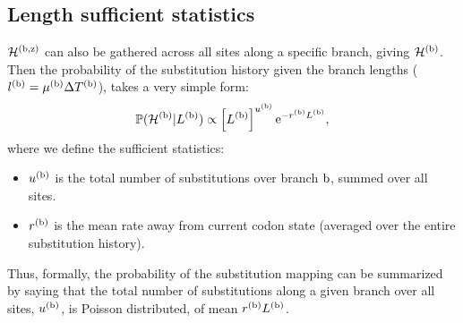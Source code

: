 \documentclass{article}
\begin{document}
	\subsection{Length sufficient statistics}
	$\mathcal{H}^{(\text{b}, \text{z})}$ can also be gathered across all sites along a specific branch, giving $\mathcal{H}^{(\text{b})}$.
	Then the probability of the {substitution} history given the branch lengths ($l^{(\text{b})} = \mu^{(\text{b})} \Delta T^{(\text{b})}$), takes a very simple form:
	\begin{equation}
		\label{eq:LengthSuffStat}
		\mathbb{P} (\mathcal{H}^{(\text{b})} | L^{(\text{b})}) \propto \left[ L^{(\text{b})}\right]^{u^{(\text{b})}} \text{e}^{- r^{(\text{b})} L^{(\text{b})}},
	\end{equation}
	where we define the sufficient statistics:
	\begin{itemize}
		\setlength\itemsep{-0.25em}
		\item $u^{(\text{b})}$ is the total number of substitutions over branch $\text{b}$, summed over all sites.
		\item $r^{(\text{b})}$ is the mean rate away from current {codon} state (averaged over the entire {substitution} history).
	\end{itemize}
	Thus, formally, the probability of the {substitution} mapping can be summarized by saying that the total number of substitutions along a given branch over all sites, $u^{(\text{b})}$, is Poisson distributed, of mean $r^{(\text{b})} L^{(\text{b})}$.
\end{document}
